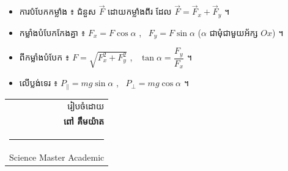 \documentclass[12pt,a4paper]{article}
\newcommand{\vF}{\vec{F}}
\begin{document}
\begin{summary}
\begin{itemize}[leftmargin=1.4em,itemsep=2pt]
  \item ការបំបែកកម្លាំង ៖ ជំនួស $\vF$ ដោយកម្លាំងពីរ ដែល $\vF=\vF_x+\vF_y$ ។
  \item កម្លាំងបំបែកកែងគ្នា ៖ $F_x=F\cos\alpha$ , \ $F_y=F\sin\alpha$
        ($\alpha$ ជាមុំជាមួយអ័ក្ស $Ox$) ។
  \item ពីកម្លាំងបំបែក ៖ $F=\sqrt{F_x^2+F_y^2}$ , \ $\tan\alpha=\dfrac{F_y}{F_x}$ ។
  \item លើប្លង់ទេរ ៖ $P_{\parallel}=mg\sin\alpha$ , \ $P_{\perp}=mg\cos\alpha$ ។
\end{itemize}
\end{summary}

\vspace{0.8cm}
\begin{flushright}
\begin{tabular}{r}
{\color{inkgray}រៀបចំដោយ}\\
{\large\bfseries\color{navy}ពៅ គឹមយ៉ាត}\\
{\color{gold}\rule{4.5cm}{1pt}}\\
{\small\color{teal}Science Master Academic}
\end{tabular}
\end{flushright}
\end{document}
